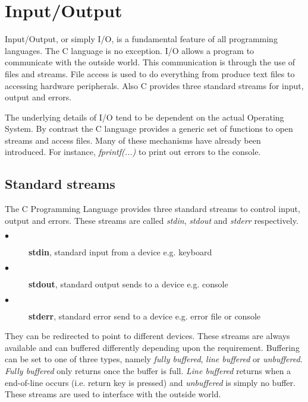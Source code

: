 \section{Input/Output} \label{IO}

Input/Output, or simply I/O, is a fundamental feature of all programming languages. The C language is no exception. I/O allows a program to communicate with the outside world. This communication is through the use of files and streams. File access is used to do everything from produce text files to accessing hardware peripherals. Also C provides three standard streams for input, output and errors.  

The underlying details of I/O tend to be dependent on the actual Operating System. By contrast the C language provides a generic set of functions to open streams and access files. Many of these mechanisms have already been introduced. For instance, \textit{fprintf(...)} to print out errors to the console.

\subsection{Standard streams}

The C Programming Language provides three standard streams to control input, output and errors. These streams are called \textit{stdin}, \textit{stdout} and \textit{stderr} respectively. 


\begin{description}
  \item[$\bullet$] \textbf{stdin}, standard input from a device e.g. keyboard 
  \item[$\bullet$] \textbf{stdout}, standard output sends to a device e.g. console  
  \item[$\bullet$] \textbf{stderr}, standard error send to a device e.g. error file or console
\end{description}

They can be redirected to point to different devices. These streams are always available and can buffered differently depending upon the requirement. Buffering can be set to one of three types, namely \textit{fully buffered}, \textit{line buffered} or \textit{unbuffered}. \textit{Fully buffered} only returns once the buffer is full. \textit{Line buffered} returns when a end-of-line occurs (i.e. return key is pressed) and \textit{unbuffered} is simply no buffer. These streams are used to interface with the outside world. 

